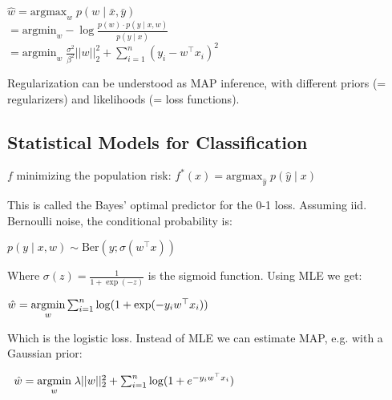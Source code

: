 $\hat w = \text{argmax}_w \; p(w \; | \; \bar x, \bar y)$ \\[-8pt]

\quad $= \text{argmin}_w - \log \frac{p(w) \cdot p( y \; | \; x, w)}{p( y \; | \; x)} $ \\[-8pt]

\quad $= \text{argmin}_w \; \frac{\sigma^2}{\beta^2} ||w||_2^2 + \sum_{i=1}^n(y_i - w^\top x_i)^2$

Regularization can be understood as MAP inference, with different priors (= regularizers) and likelihoods (= loss functions).

\subsection*{Statistical Models for Classification}

$f$ minimizing the population risk: $f^*(x) = \text{argmax}_{\hat y} \; p(\hat y \; | \; x)$

This is called the Bayes' optimal predictor for the 0-1 loss. Assuming iid. Bernoulli noise, the conditional probability is:

\qquad \qquad$p(y \; | \; x,w) \sim \text{Ber}(y; \sigma(w^\top x))$

Where $\sigma(z) = \frac{1}{1 + \exp(-z)}$ is the sigmoid function. Using MLE we get:

\quad \;$\hat w = \underset{w}{\text{argmin}} \sum_{i = 1}^n \log (1 + \exp(-y_i w^\top x_i))$

Which is the logistic loss. Instead of MLE we can estimate MAP, e.g. with a Gaussian prior:

$\; \;\hat w = \underset{w}{\text{argmin}} \; \lambda ||w||_2^2 + \sum_{i = 1}^n \log (1 + e^{-y_i w^\top x_i})$






